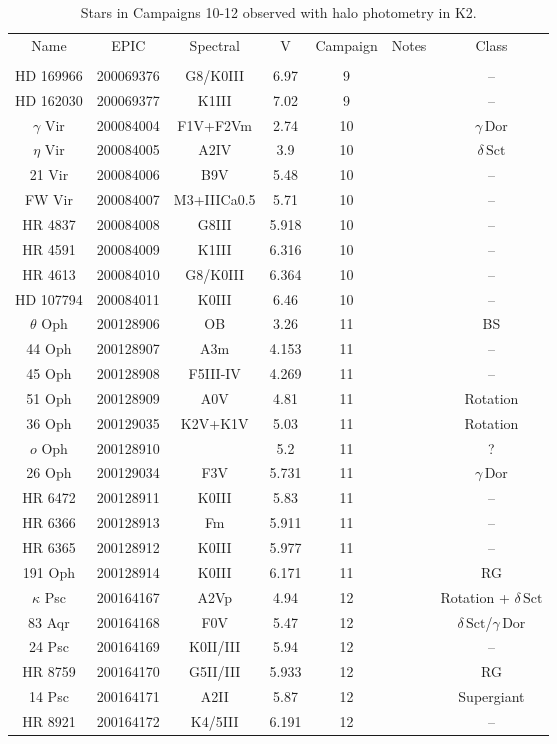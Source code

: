 \begin{table*}
\caption{Stars in Campaigns 10-12 observed with halo photometry in K2.\label{table_2}}
\begin{tabular}{ccccccc}
\hline \hline
Name & EPIC & Spectral & V & Campaign & Notes & Class \\
 &  &  &  &  &  &  \\
\hline
HD 169966 & 200069376 & G8/K0III & 6.97 & 9 &  & -- \\
HD 162030 & 200069377 & K1III & 7.02 & 9 &  & -- \\
$\gamma$ Vir & 200084004 & F1V+F2Vm & 2.74 & 10 &  & $\gamma\,\text{Dor}$ \\
$\eta$ Vir & 200084005 & A2IV & 3.9 & 10 &  & $\delta\,\text{Sct}$ \\
21 Vir & 200084006 & B9V & 5.48 & 10 &  & -- \\
FW Vir & 200084007 & M3+IIICa0.5 & 5.71 & 10 &  & -- \\
HR 4837 & 200084008 & G8III & 5.918 & 10 &  & -- \\
HR 4591 & 200084009 & K1III & 6.316 & 10 &  & -- \\
HR 4613 & 200084010 & G8/K0III & 6.364 & 10 &  & -- \\
HD 107794 & 200084011 & K0III & 6.46 & 10 &  & -- \\
$\theta$ Oph & 200128906 & OB & 3.26 & 11 &  & BS \\
44 Oph & 200128907 & A3m & 4.153 & 11 &  & -- \\
45 Oph & 200128908 & F5III-IV & 4.269 & 11 &  & -- \\
51 Oph & 200128909 & A0V & 4.81 & 11 &  & Rotation \\
36 Oph & 200129035 & K2V+K1V & 5.03 & 11 &  & Rotation \\
$o$ Oph & 200128910 &  & 5.2 & 11 &  & ? \\
26 Oph & 200129034 & F3V & 5.731 & 11 &  & $\gamma\,\text{Dor}$ \\
HR 6472 & 200128911 & K0III & 5.83 & 11 &  & -- \\
HR 6366 & 200128913 & Fm & 5.911 & 11 &  & -- \\
HR 6365 & 200128912 & K0III & 5.977 & 11 &  & -- \\
191 Oph & 200128914 & K0III & 6.171 & 11 &  & RG \\
$\kappa$ Psc & 200164167 & A2Vp & 4.94 & 12 &  & Rotation + $\delta\,\text{Sct}$ \\
83 Aqr & 200164168 & F0V & 5.47 & 12 &  & $\delta\,\text{Sct}$/$\gamma\,\text{Dor}$ \\
24 Psc & 200164169 & K0II/III & 5.94 & 12 &  & -- \\
HR 8759 & 200164170 & G5II/III & 5.933 & 12 &  & RG \\
14 Psc & 200164171 & A2II & 5.87 & 12 &  & Supergiant \\
HR 8921 & 200164172 & K4/5III & 6.191 & 12 &  & -- \\
\hline
\end{tabular}
\end{table*}
